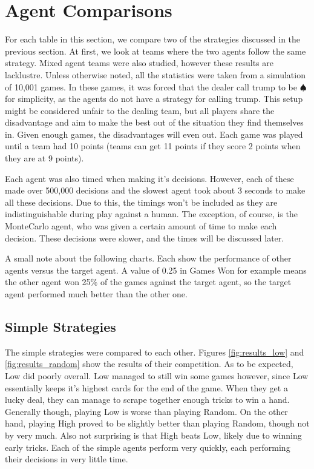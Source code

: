 
\section{Agent Comparisons}

For each table in this section, we compare two of the strategies discussed in the previous section. At first, we look at
teams where the two agents follow the same strategy. Mixed agent teams were also studied, however these results are lacklustre.
Unless otherwise noted, all the statistics were taken from a simulation of 10,001 games. In these games, it was forced
that the dealer call trump to be $\spadesuit$ for simplicity, as the agents do not have a strategy for calling trump.
This setup might be considered unfair to the dealing team, but all players share the disadvantage and aim to make the best
out of the situation they find themselves in. Given enough games, the disadvantages will even out.
Each game was played until a team had 10 points (teams can get 11 points if they score 2 points when they are at 9 points).

Each agent was also timed when making it's decisions. However, each of these made over 500,000 decisions and the slowest
agent took about 3 seconds to make all these decisions. Due to this, the timings won't be included as they are indistinguishable
during play against a human. The exception, of course, is the MonteCarlo agent, who was given a certain amount of time to make each
decision. These decisions were slower, and the times will be discussed later.

A small note about the following charts. Each show the performance of other agents versus the target agent. A value of 0.25 in Games Won
for example means the other agent won 25\% of the games against the target agent, so the target agent performed much better than the other one.


\subsection{Simple Strategies}

The simple strategies were compared to each other. Figures \ref{fig:results_low} and \ref{fig:results_random} show the results of their competition.
As to be expected, Low did poorly overall. Low managed to still win some games however, since Low essentially keeps it's highest cards for the
end of the game. When they get a lucky deal, they can manage to scrape together enough tricks to win a hand. Generally though, playing Low is
worse than playing Random. On the other hand, playing High proved to be slightly better than playing Random, though not by very much.
Also not surprising is that High beats Low, likely due to winning early tricks. Each of the simple agents perform very quickly, each performing
their decisions in very little time.


